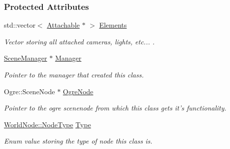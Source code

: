 \subsubsection*{Protected Attributes}
\begin{DoxyCompactItemize}
\item 
\hypertarget{classphys_1_1WorldNode_a2a17c53f3a7ad3d5bd322855096fcbc3}{
std::vector$<$ \hyperlink{classphys_1_1Attachable}{Attachable} $\ast$ $>$ \hyperlink{classphys_1_1WorldNode_a2a17c53f3a7ad3d5bd322855096fcbc3}{Elements}}
\label{classphys_1_1WorldNode_a2a17c53f3a7ad3d5bd322855096fcbc3}

\begin{DoxyCompactList}\small\item\em Vector storing all attached cameras, lights, etc... . \item\end{DoxyCompactList}\item 
\hypertarget{classphys_1_1WorldNode_a070f1686f70880dac0241c96518c7a8a}{
\hyperlink{classphys_1_1SceneManager}{SceneManager} $\ast$ \hyperlink{classphys_1_1WorldNode_a070f1686f70880dac0241c96518c7a8a}{Manager}}
\label{classphys_1_1WorldNode_a070f1686f70880dac0241c96518c7a8a}

\begin{DoxyCompactList}\small\item\em Pointer to the manager that created this class. \item\end{DoxyCompactList}\item 
\hypertarget{classphys_1_1WorldNode_abc3e4ddcd1dc2f15ffa40ed2d18b5fd8}{
Ogre::SceneNode $\ast$ \hyperlink{classphys_1_1WorldNode_abc3e4ddcd1dc2f15ffa40ed2d18b5fd8}{OgreNode}}
\label{classphys_1_1WorldNode_abc3e4ddcd1dc2f15ffa40ed2d18b5fd8}

\begin{DoxyCompactList}\small\item\em Pointer to the ogre scenenode from which this class gets it's functionality. \item\end{DoxyCompactList}\item 
\hypertarget{classphys_1_1WorldNode_aef2329f38799c3d67f1f1f69b35dda20}{
\hyperlink{classphys_1_1WorldNode_a0b178b06aa411b00c4c2ccd926d9bf5a}{WorldNode::NodeType} \hyperlink{classphys_1_1WorldNode_aef2329f38799c3d67f1f1f69b35dda20}{Type}}
\label{classphys_1_1WorldNode_aef2329f38799c3d67f1f1f69b35dda20}

\begin{DoxyCompactList}\small\item\em Enum value storing the type of node this class is. \item\end{DoxyCompactList}\end{DoxyCompactItemize}


